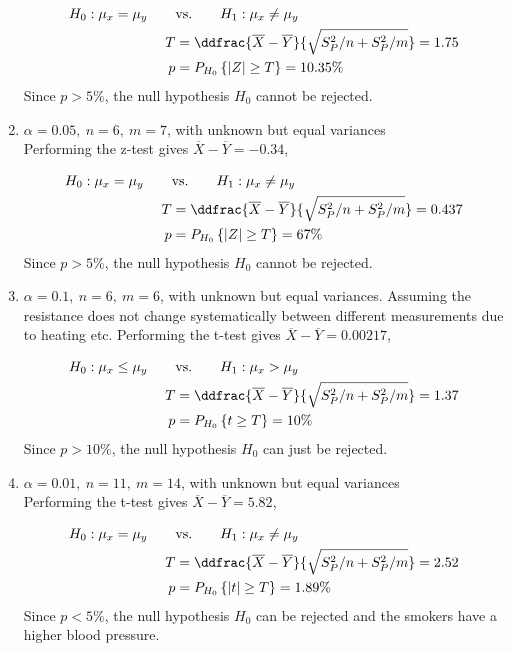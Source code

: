 \begin{enumerate}
	\begin{align}
		H_0 : \mu_x = \mu_y \qquad &\text{vs.} \qquad H_1 : \mu_x \neq \mu_y \nonumber \\
		T &= \ddfrac{ \overline{X} - \overline{Y} }{\sqrt{S_P^2/n + S_P^2/m}} = 1.75\nonumber \\
		p &= P_{H_0}\left\{|Z| \geq T\right\} = 10.35\% 
	\end{align}
	Since $ p > 5\% $, the null hypothesis $ H_0 $ cannot be rejected.
	
	\item $\alpha = 0.05,\ n = 6,\ m = 7$, with unknown but equal variances\\
	Performing the z-test gives $ \overline{X} - \overline{Y} = -0.34 $,
	
	\begin{align}
		H_0 : \mu_x = \mu_y \qquad &\text{vs.} \qquad H_1 : \mu_x \neq \mu_y \nonumber \\
		T &= \ddfrac{ \overline{X} - \overline{Y} }{\sqrt{S_P^2/n + S_P^2/m}} = 0.437\nonumber \\
		p &= P_{H_0}\left\{|Z| \geq T\right\} = 67\% 
	\end{align}
	Since $ p > 5\% $, the null hypothesis $ H_0 $ cannot be rejected.
	
	\item $\alpha = 0.1,\ n = 6,\ m = 6$, with unknown but equal variances. Assuming the resistance does not change systematically between different measurements due to heating etc.
	Performing the t-test gives $ \overline{X} - \overline{Y} = 0.00217 $,
	
	\begin{align}
		H_0 : \mu_x \leq \mu_y \qquad &\text{vs.} \qquad H_1 : \mu_x > \mu_y \nonumber \\
		T &= \ddfrac{ \overline{X} - \overline{Y} }{\sqrt{S_P^2/n + S_P^2/m}} = 1.37\nonumber \\
		p &= P_{H_0}\left\{t \geq T\right\} = 10\% 
	\end{align}
	Since $ p > 10\% $, the null hypothesis $ H_0 $ can just be rejected.
	
	\item $\alpha = 0.01,\ n = 11,\ m = 14$, with unknown but equal variances\\
	Performing the t-test gives $ \overline{X} - \overline{Y} = 5.82 $,
	
	\begin{align}
		H_0 : \mu_x = \mu_y \qquad &\text{vs.} \qquad H_1 : \mu_x \neq \mu_y \nonumber \\
		T &= \ddfrac{ \overline{X} - \overline{Y} }{\sqrt{S_P^2/n + S_P^2/m}} = 2.52 \nonumber \\
		p &= P_{H_0}\left\{|t| \geq T\right\} = 1.89\% 
	\end{align}
	Since $ p < 5\% $, the null hypothesis $ H_0 $ can be rejected and the smokers have a higher blood pressure.
	

\end{enumerate}
